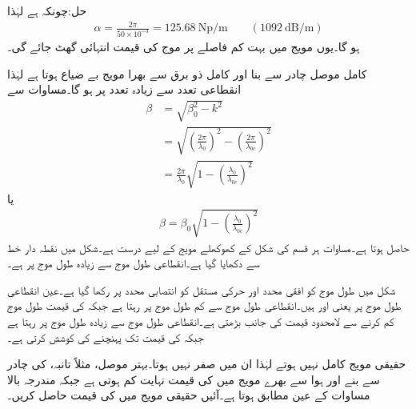 حل:چونکہ  ہے لہٰذا
\begin{align*}
\alpha=\frac{2\pi}{50\times 10^{-3}}=\SI{125.68}{\neper/\meter} \quad \quad  \left(\SI{1092}{\deci\bel\per\meter}\right)
\end{align*}
ہو گا۔یوں مویج میں بہت کم فاصلے پر موج کی قیمت انتہائی گھٹ جائے گی۔ 

کامل موصل چادر سے بنا اور کامل ذو برق سے بھرا  مویج بے ضیاع ہوتا ہے لہٰذا انقطاعی تعدد سے زیادہ  تعدد پر  ہو گا۔مساوات  سے 
\begin{align*}
\beta&=\sqrt{\beta_0^2-k^2}\\
&=\sqrt{\left(\frac{2\pi}{\lambda_0}\right)^2-\left(\frac{2\pi}{\lambda_{0c}}\right)^2}\\
&=\frac{2\pi}{\lambda_0}\sqrt{1-\left(\frac{\lambda_0}{\lambda_{0c}}\right)^2}
\end{align*}
یا
\begin{align}\label{مساوات_مویج_زاویائی_مستقل_عمومی_مساوات}
\beta=\beta_0\sqrt{1-\left(\frac{\lambda_0}{\lambda_{0c}}\right)^2}
\end{align}
حاصل ہوتا ہے۔مساوات  ہر قسم کی  شکل کے کھوکھلے مویج کے لیے درست ہے۔شکل  میں نقطہ دار خط سے  دکھایا گیا ہے۔انقطاعی طول موج سے زیادہ طول موج پر  ہے۔

شکل  میں طول موج کو افقی محدد اور حرکی مستقل کو انتصابی محدد پر رکھا گیا ہے۔عین انقطاعی طول موج  پر  یعنی  اور  ہیں۔انقطاعی طول موج سے کم طول موج پر  رہتا ہے جبکہ  کی قیمت طول موج کم کرنے سے لامحدود قیمت کی جانب بڑھتی ہے۔انقطاعی طول موج سے زیادہ طول موج پر  رہتا ہے جبکہ  کی قیمت  تک پہنچنے کی کوشش کرتی ہے۔

حقیقی مویج کامل نہیں ہوتے لہٰذا ان میں  صفر نہیں ہوتا۔بہتر موصل، مثلاً تانبہ، کی چادر سے بنے اور ہوا سے بھرے مویج میں  کی قیمت نہایت کم ہوتی ہے جبکہ  مندرجہ بالا مساوات کے عین مطابق ہوتا ہے۔آئیں حقیقی مویج میں  کی قیمت حاصل کریں۔

